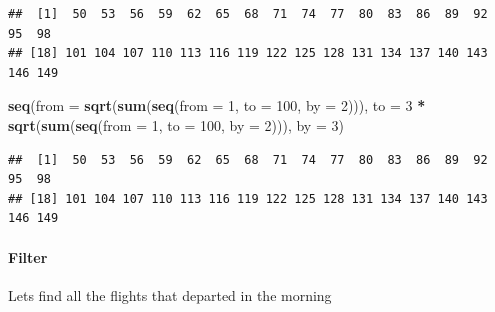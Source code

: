 \documentclass[]{article}
\newenvironment{Shaded}{\begin{snugshade}}{\end{snugshade}}
\newcommand{\KeywordTok}[1]{\textcolor[rgb]{0.13,0.29,0.53}{\textbf{#1}}}
\newcommand{\DataTypeTok}[1]{\textcolor[rgb]{0.13,0.29,0.53}{#1}}
\newcommand{\DecValTok}[1]{\textcolor[rgb]{0.00,0.00,0.81}{#1}}
\newcommand{\StringTok}[1]{\textcolor[rgb]{0.31,0.60,0.02}{#1}}
\newcommand{\OperatorTok}[1]{\textcolor[rgb]{0.81,0.36,0.00}{\textbf{#1}}}
\newcommand{\NormalTok}[1]{#1}
\let\oldparagraph\paragraph
\renewcommand{\paragraph}[1]{\oldparagraph{#1}\mbox{}}
\begin{document}
\begin{Shaded}
\end{Shaded}

\begin{verbatim}
##  [1]  50  53  56  59  62  65  68  71  74  77  80  83  86  89  92  95  98
## [18] 101 104 107 110 113 116 119 122 125 128 131 134 137 140 143 146 149
\end{verbatim}

\begin{Shaded}
\begin{Highlighting}[]
\KeywordTok{seq}\NormalTok{(}\DataTypeTok{from =} \KeywordTok{sqrt}\NormalTok{(}\KeywordTok{sum}\NormalTok{(}\KeywordTok{seq}\NormalTok{(}\DataTypeTok{from =} \DecValTok{1}\NormalTok{, }\DataTypeTok{to =} \DecValTok{100}\NormalTok{, }\DataTypeTok{by =} \DecValTok{2}\NormalTok{))), }\DataTypeTok{to =} \DecValTok{3} \OperatorTok{*}\StringTok{ }\KeywordTok{sqrt}\NormalTok{(}\KeywordTok{sum}\NormalTok{(}\KeywordTok{seq}\NormalTok{(}\DataTypeTok{from =} \DecValTok{1}\NormalTok{, }\DataTypeTok{to =} \DecValTok{100}\NormalTok{, }\DataTypeTok{by =} \DecValTok{2}\NormalTok{))), }\DataTypeTok{by =} \DecValTok{3}\NormalTok{)}
\end{Highlighting}
\end{Shaded}

\begin{verbatim}
##  [1]  50  53  56  59  62  65  68  71  74  77  80  83  86  89  92  95  98
## [18] 101 104 107 110 113 116 119 122 125 128 131 134 137 140 143 146 149
\end{verbatim}

\paragraph{Filter}\label{filter}

Lets find all the flights that departed in the morning
\end{document}
